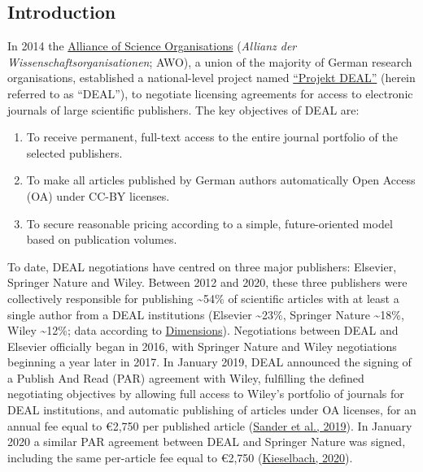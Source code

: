 \documentclass[
]{article}
\providecommand{\tightlist}{%
  \setlength{\itemsep}{0pt}\setlength{\parskip}{0pt}}
\begin{document}
\pagebreak

\hypertarget{introduction}{%
\subsection{Introduction}\label{introduction}}

In 2014 the \href{https://wissenschaftsfreiheit.de/}{Alliance of Science Organisations} (\emph{Allianz der Wissenschaftsorganisationen}; AWO), a union of the majority of German research organisations, established a national-level project named \href{https://www.projekt-deal.de}{``Projekt DEAL''} (herein referred to as ``DEAL''), to negotiate licensing agreements for access to electronic journals of large scientific publishers. The key objectives of DEAL are:

\begin{enumerate}
\def\labelenumi{\arabic{enumi}.}
\tightlist
\item
  To receive permanent, full-text access to the entire journal portfolio of the selected publishers.
\item
  To make all articles published by German authors automatically Open Access (OA) under CC-BY licenses.
\item
  To secure reasonable pricing according to a simple, future-oriented model based on publication volumes.
\end{enumerate}

To date, DEAL negotiations have centred on three major publishers: Elsevier, Springer Nature and Wiley. Between 2012 and 2020, these three publishers were collectively responsible for publishing \textasciitilde54\% of scientific articles with at least a single author from a DEAL institutions (Elsevier \textasciitilde23\%, Springer Nature \textasciitilde18\%, Wiley \textasciitilde12\%; data according to \href{https://www.dimensions.ai/}{Dimensions}). Negotiations between DEAL and Elsevier officially began in 2016, with Springer Nature and Wiley negotiations beginning a year later in 2017. In January 2019, DEAL announced the signing of a Publish And Read (PAR) agreement with Wiley, fulfilling the defined negotiating objectives by allowing full access to Wiley's portfolio of journals for DEAL institutions, and automatic publishing of articles under OA licenses, for an annual fee equal to €2,750 per published article (\href{https://doi.org/10.17617/2.3027595}{Sander et al., 2019}). In January 2020 a similar PAR agreement between DEAL and Springer Nature was signed, including the same per-article fee equal to €2,750 (\href{https://doi.org/10.17617/2.3174351}{Kieselbach, 2020}).
\end{document}

